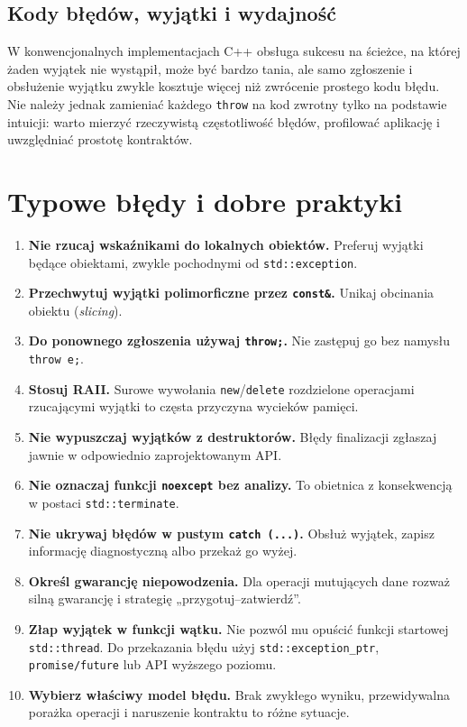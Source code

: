 \subsection{Kody błędów, wyjątki i wydajność}

W konwencjonalnych implementacjach C++ obsługa sukcesu na ścieżce,
na której żaden wyjątek nie wystąpił, może być bardzo tania, ale samo
zgłoszenie i obsłużenie wyjątku zwykle kosztuje więcej niż zwrócenie
prostego kodu błędu. Nie należy jednak zamieniać każdego \texttt{throw}
na kod zwrotny tylko na podstawie intuicji: warto mierzyć rzeczywistą
częstotliwość błędów, profilować aplikację i uwzględniać prostotę
kontraktów.

\section{Typowe błędy i dobre praktyki}
\label{sec:cpp11-guidelines}

\begin{enumerate}
\item \textbf{Nie rzucaj wskaźnikami do lokalnych obiektów.}
      Preferuj wyjątki będące obiektami, zwykle pochodnymi od
      \texttt{std::exception}.
\item \textbf{Przechwytuj wyjątki polimorficzne przez
      \texttt{const\&}.} Unikaj obcinania obiektu (\emph{slicing}).
\item \textbf{Do ponownego zgłoszenia używaj \texttt{throw;}.}
      Nie zastępuj go bez namysłu \texttt{throw e;}.
\item \textbf{Stosuj RAII.} Surowe wywołania \texttt{new}/\texttt{delete}
      rozdzielone operacjami rzucającymi wyjątki to częsta przyczyna
      wycieków pamięci.
\item \textbf{Nie wypuszczaj wyjątków z destruktorów.}
      Błędy finalizacji zgłaszaj jawnie w odpowiednio zaprojektowanym API.
\item \textbf{Nie oznaczaj funkcji \texttt{noexcept} bez analizy.}
      To obietnica z konsekwencją w postaci \texttt{std::terminate}.
\item \textbf{Nie ukrywaj błędów w pustym \texttt{catch (...)}.}
      Obsłuż wyjątek, zapisz informację diagnostyczną albo przekaż go wyżej.
\item \textbf{Określ gwarancję niepowodzenia.} Dla operacji mutujących
      dane rozważ silną gwarancję i strategię „przygotuj–zatwierdź”.
\item \textbf{Złap wyjątek w funkcji wątku.}
      Nie pozwól mu opuścić funkcji startowej \texttt{std::thread}.
      Do przekazania błędu użyj \texttt{std::exception\_ptr},
      \texttt{promise/future} lub API wyższego poziomu.
\item \textbf{Wybierz właściwy model błędu.} Brak zwykłego wyniku,
      przewidywalna porażka operacji i naruszenie kontraktu to różne
      sytuacje.
\end{enumerate}

